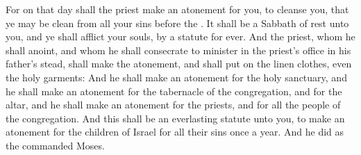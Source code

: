 \begin{biblechapter}
\verse For on that day shall the priest make an atonement for you, to cleanse you, that ye may be clean from all your sins before the \LORD.
\verse It shall be a Sabbath of rest unto you, and ye shall afflict your souls, by a statute for ever.
\verse And the priest, whom he shall anoint, and whom he shall consecrate to minister in the priest's office in his father's stead, shall make the atonement, and shall put on the linen clothes, even the holy garments:
\verse And he shall make an atonement for the holy sanctuary, and he shall make an atonement for the tabernacle of the congregation, and for the altar, and he shall make an atonement for the priests, and for all the people of the congregation.
\verse And this shall be an everlasting statute unto you, to make an atonement for the children of Israel for all their sins once a year. And he did as the \LORD commanded Moses.
\end{biblechapter}

\flushcolsend %


